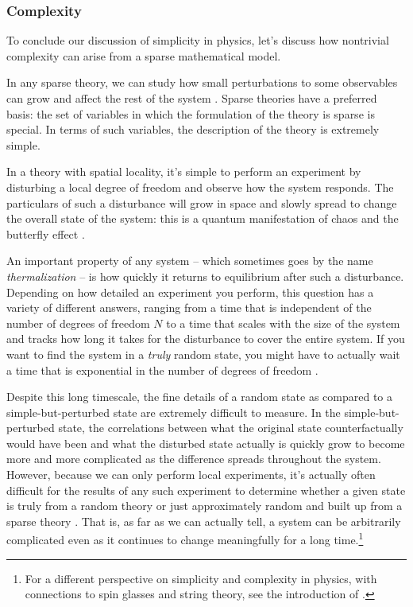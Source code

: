 \documentclass[12pt]{article}
\begin{document}
 












\subsubsection*{Complexity}
To conclude our discussion of simplicity in physics, let's discuss how nontrivial complexity can arise from a sparse mathematical model. 



In any sparse theory, we can study how small perturbations to some observables can grow and affect the rest of the system \cite{Lieb:1972wy,Sekino:2008he,Maldacena:2015waa}. Sparse theories have a preferred basis: the set of variables in which the formulation of the theory is sparse is special. In terms of such variables, the description of the theory is extremely simple.

In a theory with spatial locality, it's simple to perform an experiment by disturbing a local degree of freedom and observe how the system responds. The particulars of such a disturbance will grow in space and slowly spread to change the  overall state of the system: this is a quantum manifestation of chaos and the butterfly effect \cite{Larkin:1969abc,Maldacena:2015waa}.

An important property of any system -- which sometimes goes by the name \emph{thermalization} -- is how quickly it returns to equilibrium after such a disturbance. Depending on how detailed an experiment you perform, this question has a variety of different answers, ranging from a time that is independent of the number of degrees of freedom $N$ to a time that scales with the size of the system and tracks how long it takes for the disturbance to cover the entire system. If you want to find the system in a \emph{truly} random state, you might have to actually wait a time that is exponential in the number of degrees of freedom \cite{Susskind:2015toa}.

Despite this long timescale, the fine details of a random state as compared to a simple-but-perturbed state are extremely difficult to measure. In the simple-but-perturbed state, the correlations between what the original state counterfactually would have been and what the disturbed state actually is quickly grow to become more and more complicated as the difference spreads throughout the system.  However, because we can only perform local experiments, 
it's actually often difficult for the results of any such experiment to determine whether a given state is truly from a random theory or just approximately random and built up from a sparse theory \cite{Sekino:2008he,Hayden:2007cs,Lashkari:2011yi,Brandao:2012qcp,Brown:2012gy}.
That is, as far as we can actually tell, a system can be arbitrarily complicated even as it continues to change meaningfully for a long time.\footnote{For a different perspective on simplicity and complexity in physics, with connections to spin glasses and string theory, see the introduction of \cite{Denef:2011ee}.}
\end{document}
